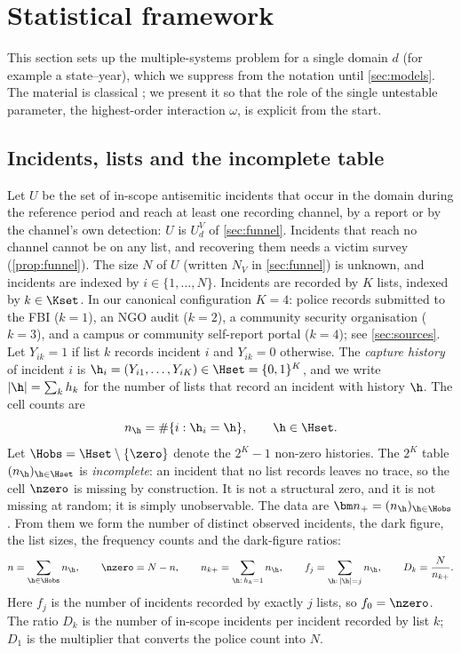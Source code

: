 \section{Statistical framework}\label{sec:framework}

This section sets up the multiple-systems problem for a single domain $d$ (for example a state--year), which we suppress from the notation until \cref{sec:models}. The material is classical \citep{darroch1958,fienberg1972,bishop1975,international1995}; we present it so that the role of the single untestable parameter, the highest-order interaction $\omega$, is explicit from the start.

\subsection{Incidents, lists and the incomplete table}\label{sec:fw-table}

Let $U$ be the set of in-scope antisemitic incidents that occur in the domain during the reference period and reach at least one recording channel, by a report or by the channel's own detection: $U$ is $U^V_d$ of \cref{sec:funnel}. Incidents that reach no channel cannot be on any list, and recovering them needs a victim survey (\cref{prop:funnel}). The size $N$ of $U$ (written $N_V$ in \cref{sec:funnel}) is unknown, and incidents are indexed by $i\in\{1,\dots,N\}$. Incidents are recorded by $K$ lists, indexed by $k\in\Kset$. In our canonical configuration $K=4$: police records submitted to the FBI ($k=1$), an NGO audit ($k=2$), a community security organisation ($k=3$), and a campus or community self-report portal ($k=4$); see \cref{sec:sources}. Let $Y_{ik}=1$ if list $k$ records incident $i$ and $Y_{ik}=0$ otherwise. The \emph{capture history} of incident $i$ is $\h_i=(Y_{i1},\dots,Y_{iK})\in\Hset=\{0,1\}^K$, and we write $|\h|=\sum_k h_k$ for the number of lists that record an incident with history $\h$. The cell counts are
\[
  n_{\h}=\#\{i:\h_i=\h\},\qquad \h\in\Hset .
\]
Let $\Hobs=\Hset\setminus\{\zero\}$ denote the $2^K-1$ non-zero histories. The $2^K$ table $(n_{\h})_{\h\in\Hset}$ is \emph{incomplete}: an incident that no list records leaves no trace, so the cell $\nzero$ is missing by construction. It is not a structural zero, and it is not missing at random; it is simply unobservable. The data are $\bm n_+=(n_{\h})_{\h\in\Hobs}$. From them we form the number of distinct observed incidents, the dark figure, the list sizes, the frequency counts and the dark-figure ratios:
\begin{equation}\label{eq:fw-dark}
  n=\sum_{\h\in\Hobs}n_{\h},\qquad
  \nzero=N-n,\qquad
  n_{k+}=\sum_{\h:\,h_k=1}n_{\h},\qquad
  f_j=\sum_{\h:\,|\h|=j}n_{\h},\qquad
  D_k=\frac{N}{n_{k+}} .
\end{equation}
Here $f_j$ is the number of incidents recorded by exactly $j$ lists, so $f_0=\nzero$. The ratio $D_k$ is the number of in-scope incidents per incident recorded by list $k$; $D_1$ is the multiplier that converts the police count into $N$.

